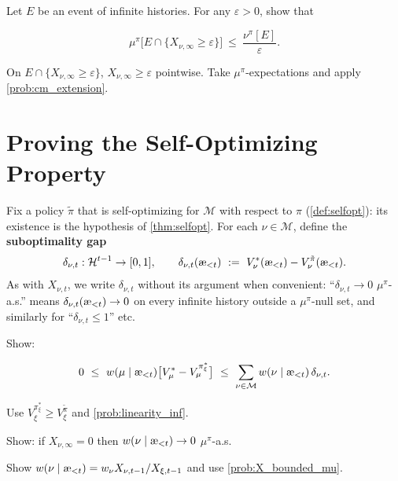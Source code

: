 \documentclass[fontsize=11pt, parskip=half]{scrartcl}
\newcommand{\cH}{\mathcal{H}}
\newcommand{\cM}{\mathcal{M}}
\newcommand{\aes}{\textnormal{\ae}}
\begin{document}
\begin{exercise}
\label{prob:markov_cm}
Let $E$ be an event of infinite histories. For any $\varepsilon > 0$, show that

\[
    \mu^\pi\big[E \cap \{X_{\nu,\infty} \geq \varepsilon\}\big] ~\leq~ \frac{\nu^\pi[E]}{\varepsilon}.
\]
\begin{hint}
On $E \cap \{X_{\nu,\infty} \geq \varepsilon\}$, $X_{\nu,\infty} \geq \varepsilon$ pointwise. Take $\mu^\pi$-expectations and apply \cref{prob:cm_extension}.
\end{hint}
\end{exercise}



\section{Proving the Self-Optimizing Property}\label{prob:selfopt}

Fix a policy $\tilde\pi$ that is self-optimizing for $\cM$ with respect to $\pi$ (\cref{def:selfopt}): its existence is the hypothesis of \cref{thm:selfopt}.
For each $\nu \in \cM$, define the \textbf{suboptimality gap}
\[
    \delta_{\nu,t} : \cH^{t-1} \to [0,1], \qquad \delta_{\nu,t}(\aes_{<t}) ~:=~ V_\nu^*(\aes_{<t}) - V_\nu^{\tilde\pi}(\aes_{<t}).
\]
As with $X_{\nu,t}$, we write $\delta_{\nu,t}$ without its argument when convenient: ``$\delta_{\nu,t} \to 0$ $\mu^\pi$-a.s.'' means $\delta_{\nu,t}(\aes_{<t}) \to 0$ on every infinite history outside a $\mu^\pi$-null set, and similarly for ``$\delta_{\nu,t} \leq 1$'' etc.

\begin{exercise}
\label{prob:chain_ineq}
Show:

\[
    0 ~\leq~ w(\mu \mid \aes_{<t}) \big[V_\mu^* - V_\mu^{\pi_\xi^*}\big]
    ~\leq~ \sum_{\nu \in \cM} w(\nu \mid \aes_{<t})\, \delta_{\nu,t}.
\]
\begin{hint}
Use $V_\xi^{\pi_\xi^*} \geq V_\xi^{\tilde\pi}$ and \cref{prob:linearity_inf}.
\end{hint}
\end{exercise}


\begin{exercise}
\label{prob:vanishing_posterior}
Show: if $X_{\nu,\infty} = 0$ then $w(\nu \mid \aes_{<t}) \to 0$ $\mu^\pi$-a.s.


\begin{hint}
Show $w(\nu \mid \aes_{<t}) = w_\nu X_{\nu,t-1}/X_{\xi,t-1}$ and use \cref{prob:X_bounded_mu}.
\end{hint}
\end{exercise}
\end{document}
